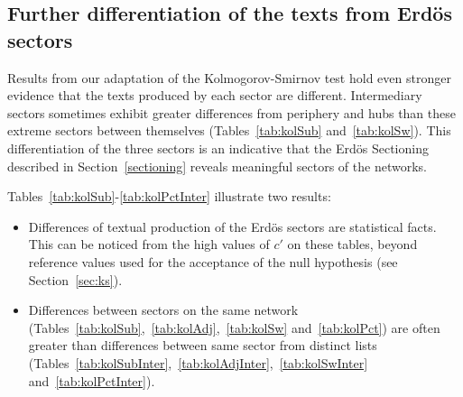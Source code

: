
%
%
%
%
%
%
%
%
%
%
%
%
%





\subsection{Further differentiation of the texts from Erd\"os sectors}\label{subsec:di}








Results from our adaptation of the Kolmogorov-Smirnov test
hold even stronger evidence
that the texts produced by each sector are different.
Intermediary sectors sometimes exhibit greater differences 
from periphery and hubs than these extreme sectors between themselves 
(Tables~\ref{tab:kolSub} and~\ref{tab:kolSw}).
This differentiation of the three sectors is an
indicative that the Erd\"os Sectioning
described in Section~\ref{sectioning} reveals meaningful
sectors of the networks.

Tables~\ref{tab:kolSub}-\ref{tab:kolPctInter}
illustrate two results:
\begin{itemize}
    \item Differences of textual production of the Erd\"os sectors are statistical facts.
	    This can be noticed from the high values of $c'$ on these tables,
	    beyond reference values used for the acceptance of the 
	    null hypothesis (see Section~\ref{sec:ks}).
    \item Differences between sectors on the same network 
	    (Tables~\ref{tab:kolSub},~\ref{tab:kolAdj},~\ref{tab:kolSw} and~\ref{tab:kolPct}) are often greater than differences between same sector from distinct lists (Tables~\ref{tab:kolSubInter},~\ref{tab:kolAdjInter},~\ref{tab:kolSwInter} and~\ref{tab:kolPctInter}).
\end{itemize}


